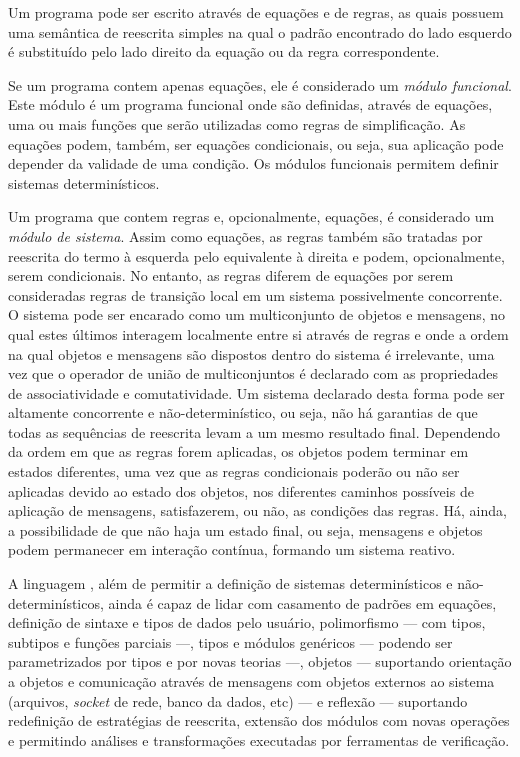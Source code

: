 Um programa \Maude pode ser escrito através de equações e de regras, as quais possuem uma semântica de reescrita simples na qual o padrão encontrado do lado esquerdo é substituído pelo lado direito da equação ou da regra correspondente.

Se um programa \Maude contem apenas equações, ele é considerado um \textit{módulo funcional}.
Este módulo é um programa funcional onde são definidas, através de equações, uma ou mais funções que serão utilizadas como regras de simplificação.
As equações podem, também, ser equações condicionais, ou seja, sua aplicação pode depender da validade de uma condição.
Os módulos funcionais permitem definir sistemas determinísticos.

Um programa que contem regras e, opcionalmente, equações, é considerado um \textit{módulo de sistema}.
Assim como equações, as regras também são tratadas por reescrita do termo à esquerda pelo equivalente à direita e podem, opcionalmente, serem condicionais.
No entanto, as regras diferem de equações por serem consideradas regras de transição local em um sistema possivelmente concorrente.
O sistema pode ser encarado como um multiconjunto de objetos e mensagens, no qual estes últimos interagem localmente entre si através de regras e onde a ordem na qual objetos e mensagens são dispostos dentro do sistema é irrelevante, uma vez que o operador de união de multiconjuntos é declarado com as propriedades de associatividade e comutatividade.
Um sistema declarado desta forma pode ser altamente concorrente e não-determinístico, ou seja, não há garantias de que todas as sequências de reescrita levam a um mesmo resultado final.
Dependendo da ordem em que as regras forem aplicadas, os objetos podem terminar em estados diferentes, uma vez que as regras condicionais poderão ou não ser aplicadas devido ao estado dos objetos, nos diferentes caminhos possíveis de aplicação de mensagens, satisfazerem, ou não, as condições das regras.
Há, ainda, a possibilidade de que não haja um estado final, ou seja, mensagens e objetos podem permanecer em interação contínua, formando um sistema reativo.

A linguagem \Maude, além de permitir a definição de sistemas determinísticos e não-determinísticos, ainda é capaz de lidar com casamento de padrões em equações, definição de sintaxe e tipos de dados pelo usuário, polimorfismo --- com tipos, subtipos e funções parciais  ---, tipos e módulos genéricos  --- podendo ser parametrizados por tipos e por novas teorias  ---, objetos --- suportando orientação a objetos e comunicação através de mensagens com objetos externos ao sistema (arquivos, 
\textit{socket} de rede, banco da dados, etc) --- e reflexão --- suportando redefinição de estratégias de reescrita, extensão dos módulos com novas operações e permitindo análises e transformações executadas por ferramentas de verificação.

